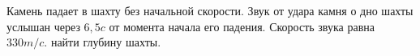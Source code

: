 Камень падает в шахту без начальной скорости.
Звук от удара камня о дно шахты услышан через $6,5c$ от момента начала его падения.
Скорость звука равна $330 m/c$. найти глубину шахты.
 